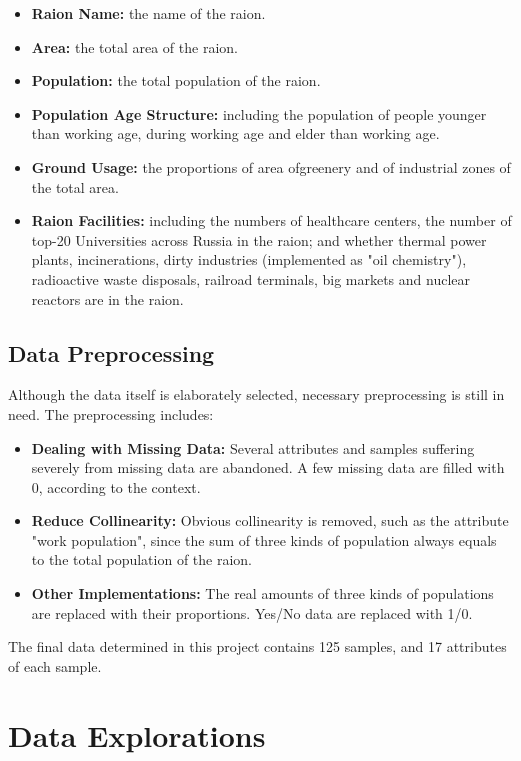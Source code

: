 \documentclass{article}
\begin{document}
\begin{itemize}
\item \textbf{Raion Name:} the name of the raion.
\item \textbf{Area:} the total area of the raion.
\item \textbf{Population:} the total population of the raion.
\item \textbf{Population Age Structure:} including the population of people younger than working age, during working age and elder than working age.
\item \textbf{Ground Usage:} the proportions of area of ​​greenery and of industrial zones of ​​the total area.
\item \textbf{Raion Facilities:} including the numbers of healthcare centers, the number of top-20 Universities across Russia in the raion; and whether thermal power plants, incinerations, dirty industries (implemented as "oil chemistry"), radioactive waste disposals, railroad terminals, big markets and nuclear reactors are in the raion.
\end{itemize}

\subsection{Data Preprocessing}

Although the data itself is elaborately selected, necessary preprocessing is still in need. The preprocessing includes:

\begin{itemize}
\item \textbf{Dealing with Missing Data:} Several attributes and samples suffering severely from missing data are abandoned. A few missing data are filled with 0, according to the context.
\item \textbf{Reduce Collinearity:} Obvious collinearity is removed, such as the attribute "work population", since the sum of three kinds of population always equals to the total population of the raion.
\item \textbf{Other Implementations:} The real amounts of three kinds of populations are replaced with their proportions. Yes/No data are replaced with 1/0.
\end{itemize}

The final data determined in this project contains 125 samples, and 17 attributes of each sample.

\section{Data Explorations}
\end{document}
